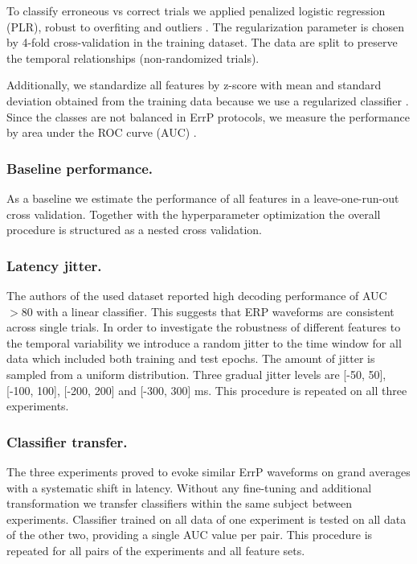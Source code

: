 \documentclass[12pt]{iopart}
\begin{document}
To classify erroneous vs correct trials we applied penalized logistic regression (PLR), robust to overfiting and
outliers \cite{parra_recipes_2005}. The regularization parameter is chosen by 4-fold cross-validation in the
training dataset. The data are split to preserve the
temporal relationships (non-randomized trials).

Additionally, we standardize all features by z-score with mean and standard deviation
obtained from the training data because we use a regularized classifier \cite{hastie_elements_2009}.
Since the classes
are not balanced in ErrP protocols, we measure the performance by area under the ROC curve (AUC) 
\cite{bradley_use_1997}.


\subsubsection*{Baseline performance.} 
As a baseline we estimate the performance of all features in a leave-one-run-out cross validation.
Together with the hyperparameter optimization the overall procedure is structured as
a nested cross validation.


\subsubsection*{Latency jitter.} 
The authors of the used dataset reported high decoding performance of AUC $> 80$ with a linear classifier.
This suggests that ERP waveforms are consistent across single trials.
In order to investigate the robustness of different features
to the temporal variability we introduce a random jitter to the time window
for all data which included both training and test epochs. The amount of jitter is sampled from a uniform distribution.
Three gradual jitter levels are [-50, 50], [-100, 100], [-200, 200] and [-300, 300] ms.
This procedure is repeated on all three experiments.

\subsubsection*{Classifier transfer.}
The three experiments proved to evoke similar ErrP waveforms on grand averages with a 
systematic shift in latency. Without any fine-tuning and additional
transformation we transfer classifiers within the same subject
between experiments. Classifier trained on all data of one experiment
is tested on all data of the other two, providing a single AUC value per pair.
This procedure is repeated for all pairs of the experiments and all feature sets.
\end{document}
